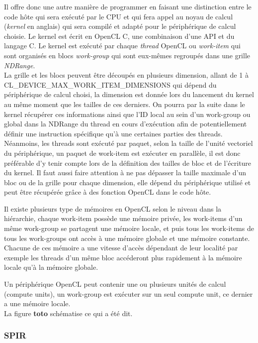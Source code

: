 Il offre donc une autre manière de programmer en faisant une distinction entre
le code hôte qui sera exécuté par le CPU et qui fera appel au noyau de calcul
(\emph{kernel} en anglais) qui sera compilé et adapté pour le périphérique de
calcul choisie. Le kernel est écrit en OpenCL C, une combinaison d'une API et du
langage C. Le kernel est exécuté par chaque \emph{thread} OpenCL ou
\emph{work-item} qui sont organisés en blocs \emph{work-group} qui sont
eux-mêmes regroupés dans une grille \emph{NDRange}.\\
La grille et les blocs peuvent être découpés en plusieurs dimension, allant de 1
à \og{} CL\_DEVICE\_MAX\_WORK\_ITEM\_DIMENSIONS \fg{} qui dépend du périphérique
de calcul choisi, la dimension est donnée lors du lancement du kernel au même
moment que les tailles de ces derniers. On pourra par la suite dans le kernel
récupérer ces informations ainsi que l'ID local au sein d'un work-group ou
global dans la NDRange du thread en cours d'exécution afin de potentiellement
définir une instruction spécifique qu'à une certaines parties des threads.
Néanmoins, les threads sont exécuté par paquet, selon la taille de l'unité
vectoriel du périphérique, un paquet de work-item est exécuter en parallèle, il
est donc préférable d'y tenir compte lors de la définition des tailles de bloc
et de l'écriture du kernel. Il faut aussi faire attention à ne pas dépasser la
taille maximale d'un bloc ou de la grille pour chaque dimension, elle dépend du
périphérique utilisé et peut être récupérée grâce à des fonction OpenCL dans le
code hôte.

Il existe plusieurs type de mémoires en OpenCL selon le niveau dans la
hiérarchie, chaque work-item possède une mémoire privée, les work-items d'un
même work-group se partagent une mémoire locale, et puis tous les work-items de
tous les work-groups ont accès à une mémoire globale et une mémoire constante.
Chacune de ces mémoire a une vitesse d'accès dépendant de leur localité par
exemple les threads d'un même bloc accéderont plus rapidement à la mémoire
locale qu'à la mémoire globale.

Un périphérique OpenCL peut contenir une ou plusieurs unités de calcul (compute
units), un work-group est exécuter sur un seul compute unit, ce dernier a une
mémoire locale.\\
La figure {\Huge\textbf{toto}} schématise ce qui a été dit.

\subsubsection{SPIR}
